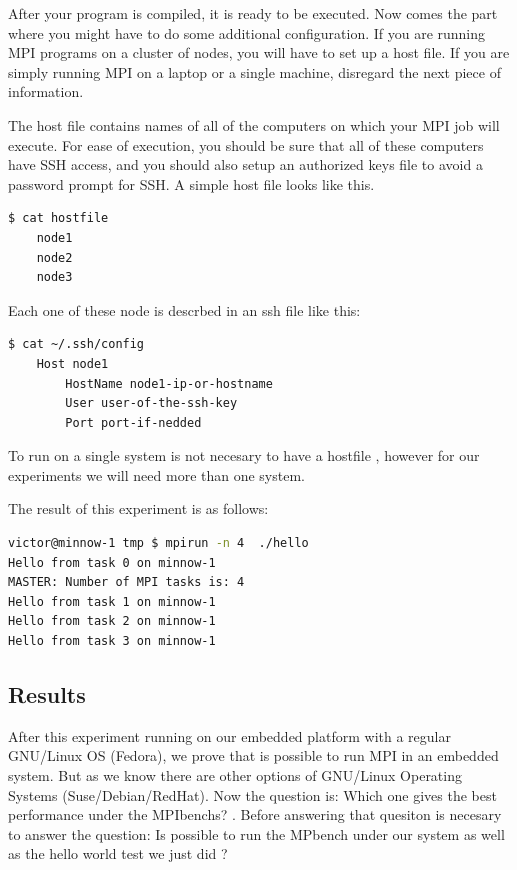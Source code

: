 After your program is compiled, it is ready to be executed. Now comes the part
where you might have to do some additional configuration. If you are running
MPI programs on a cluster of nodes, you will have to set up a host file. If you
are simply running MPI on a laptop or a single machine, disregard the next
piece of information.

The host file contains names of all of the computers on which your MPI job will
execute. For ease of execution, you should be sure that all of these computers
have SSH access, and you should also setup an authorized keys file to avoid a
password prompt for SSH. A simple host file looks like this.

\begin{lstlisting}[frame=single,language=bash]
  $ cat hostfile
    node1
    node2
    node3
\end{lstlisting}

Each one of these node is descrbed in an ssh file like this:

\begin{lstlisting}[frame=single,language=bash]
  $ cat ~/.ssh/config
    Host node1
        HostName node1-ip-or-hostname
        User user-of-the-ssh-key
        Port port-if-nedded
\end{lstlisting}

To run on a single system is not necesary to have a hostfile , however for our
experiments we will need more than one system.

The result of this experiment is as follows:

\begin{lstlisting}[frame=single,language=bash]
victor@minnow-1 tmp $ mpirun -n 4  ./hello
Hello from task 0 on minnow-1
MASTER: Number of MPI tasks is: 4
Hello from task 1 on minnow-1
Hello from task 2 on minnow-1
Hello from task 3 on minnow-1
\end{lstlisting}


\subsection{Results}

After this experiment running on our embedded platform with a regular GNU/Linux
OS (Fedora), we prove that is possible to run MPI in an embedded system. But as
we know there are other options of GNU/Linux Operating Systems
(Suse/Debian/RedHat). Now the question is: Which one gives the best
performance under the MPIbenchs? . Before answering that quesiton is necesary
to answer the question: Is possible to run the MPbench under our system as well
as the hello world test we just did ?



